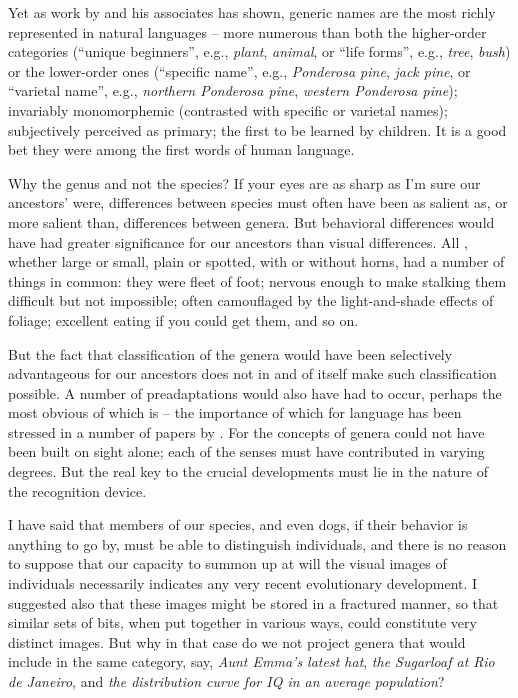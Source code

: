 Yet as work by \citet{Berlin1972} and his associates has shown, generic names are the most richly represented in natural languages -- more numerous than both the higher-order categories (``unique beginners'', e.g., \textit{plant}, \textit{animal}, or ``life forms'', e.g., \textit{tree}, \textit{bush}) or the lower-order ones (``specific name'', e.g., \textit{Ponderosa pine}, \textit{jack pine}, or ``varietal name'', e.g., \textit{northern Ponderosa pine}, \textit{western Ponderosa pine}); invariably monomorphemic (contrasted with specific or varietal names); subjectively perceived as primary; the first to be learned by children. It is a good bet they were among the first words of human language.

Why the genus and not the species? If your eyes are as sharp as I'm sure our ancestors' were, differences between species must often have been as salient as, or more salient than, differences between genera. But behavioral differences would have had greater significance for our ancestors than visual differences. All , whether large or small, plain or spotted, with or without horns, had a number of things in common: they were fleet of foot; nervous enough to make stalking them difficult but not impossible; often camouflaged by the light-and-shade effects of foliage; excellent eating if you could get them, and so on.

But the fact that classification of the genera would have been selectively advantageous for our ancestors does not in and of itself make such classification possible. A number of preadaptations would also have had to occur, perhaps the most obvious of which is  -- the importance of which for language has been stressed in a number of papers by \citet{Geschwind1974}. For the concepts of genera could not have been built on sight alone; each of the senses must have contributed in varying degrees. But the real key to the crucial developments must lie in the nature of the recognition device.

I have said that members of our species, and even dogs, if their behavior is anything to go by, must be able to distinguish individuals, and there is no reason to suppose that our capacity to summon up at will the visual images of individuals necessarily indicates any very recent evolutionary development. I suggested also that these images might be stored in a fractured manner, so that similar sets of bits, when put together in various ways, could constitute very distinct images. But why in that case do we not project genera that would include in the same category, say, \textit{Aunt Emma's latest hat}, \textit{the Sugarloaf at Rio de Janeiro}, and \textit{the distribution curve for IQ in an average population}?

